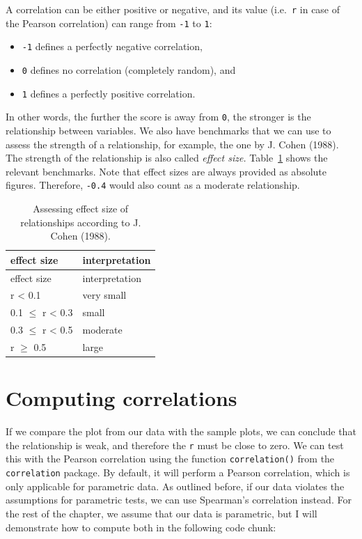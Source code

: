 \documentclass[
  letterpaper,
  DIV=11,
  numbers=noendperiod]{scrreprt}
\begin{document}
A correlation can be either positive or negative, and its value
(i.e.~\texttt{r} in case of the Pearson correlation) can range from
\texttt{-1} to \texttt{1}:

\begin{itemize}
\item
  \texttt{-1} defines a perfectly negative correlation,
\item
  \texttt{0} defines no correlation (completely random), and
\item
  \texttt{1} defines a perfectly positive correlation.
\end{itemize}

In other words, the further the score is away from \texttt{0}, the
stronger is the relationship between variables. We also have benchmarks
that we can use to assess the strength of a relationship, for example,
the one by J. Cohen (1988). The strength of the relationship is also
called \emph{effect size.} Table~\ref{tbl-effect-size-cohen} shows the
relevant benchmarks. Note that effect sizes are always provided as
absolute figures. Therefore, \texttt{-0.4} would also count as a
moderate relationship.

\begin{longtable}[]{@{}ll@{}}
\caption{Assessing effect size of relationships according to J. Cohen
(1988).}\label{tbl-effect-size-cohen}\tabularnewline
\toprule\noalign{}
effect size & interpretation \\
\midrule\noalign{}
\endfirsthead
\toprule\noalign{}
effect size & interpretation \\
\midrule\noalign{}
\endhead
\bottomrule\noalign{}
\endlastfoot
r \textless{} 0.1 & very small \\
0.1 \(\leq\) r \textless{} 0.3 & small \\
0.3 \(\leq\) r \textless{} 0.5 & moderate \\
r \(\geq\) 0.5 & large \\
\end{longtable}

\section{Computing correlations}\label{sec-computing-correlations}

If we compare the plot from our data with the sample plots, we can
conclude that the relationship is weak, and therefore the \texttt{r}
must be close to zero. We can test this with the Pearson correlation
using the function \texttt{correlation()} from the \texttt{correlation}
package. By default, it will perform a Pearson correlation, which is
only applicable for parametric data. As outlined before, if our data
violates the assumptions for parametric tests, we can use Spearman's
correlation instead. For the rest of the chapter, we assume that our
data is parametric, but I will demonstrate how to compute both in the
following code chunk:
\end{document}
